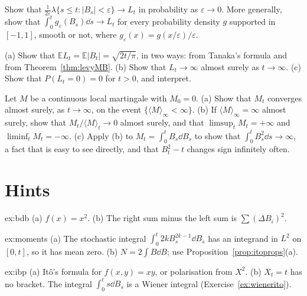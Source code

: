 \begin{exercise}[$\star\star$]\label{ex:occupation}
Show that $\frac1{2\varepsilon}\lambda\{s\le t:|B_s|<\varepsilon\}\to L_t$ in probability as $\varepsilon\to0$. More generally, show that $\int_0^tg_\varepsilon(B_s)\dd s\to L_t$ for every probability density $g$ supported in $[-1,1]$, smooth or
not, where $g_\varepsilon(x)=g(x/\varepsilon)/\varepsilon$.
\end{exercise}

\begin{exercise}[$\star$]\label{ex:locallaw}
(a) Show that $\mathbb EL_t=\mathbb E|B_t|=\sqrt{2t/\pi}$, in two ways: from Tanaka's formula and from Theorem~\ref{thm:levyMB}. (b) Show that $L_t\to\infty$ almost surely as $t\to\infty$. (c) Show that $P(L_t=0)=0$ for $t>0$,
and interpret.
\end{exercise}

\begin{exercise}[$\star\star\star$]\label{ex:martslln}
Let $M$ be a continuous local martingale with $M_0=0$. (a) Show that $M_t$ converges almost surely, as $t\to\infty$, on the event $\{\langle M\rangle_\infty<\infty\}$. (b) If $\langle M\rangle_\infty=\infty$ almost surely, show that
$M_t/\langle M\rangle_t\to0$ almost surely, and that $\limsup_t M_t=+\infty$ and $\liminf_tM_t=-\infty$. (c) Apply (b) to $M_t=\int_0^tB_s\dd B_s$ to show that $\int_0^tB_s^2\dd s\to\infty$, a fact that is easy to see
directly, and that $B_t^2-t$ changes sign infinitely often.
\end{exercise}

\section{Hints}

\begin{hint}{ex:bdb}
(a) $f(x)=x^2$. (b) The right sum minus the left sum is $\sum(\Delta B_i)^2$.
\end{hint}

\begin{hint}{ex:moments}
(a) The stochastic integral $\int_0^t2kB_s^{2k-1}\dd B_s$ has an integrand in $L^2$ on $[0,t]$, so it has mean zero. (b) $N=2\int B\dd B$; use Proposition~\ref{prop:itoprops}(a).
\end{hint}

\begin{hint}{ex:ibp}
(a) It\^o's formula for $f(x,y)=xy$, or polarisation from $X^2$. (b) $X_t=t$ has no bracket. The integral $\int_0^ts\dd B_s$ is a Wiener integral (Exercise~\ref{ex:wienerito}).
\end{hint}


